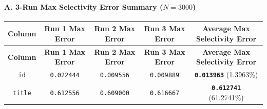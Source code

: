\documentclass[11pt,a4paper]{article}
\begin{document}
\paragraph{A. 3-Run Max Selectivity Error Summary ($N=3000$)}
{\begingroup
\small
\setlength{\tabcolsep}{4pt}
\begin{xltabular}{\textwidth}{C | C | C | C | C}
\toprule
\textbf{Column} & \textbf{Run 1 Max Error} & \textbf{Run 2 Max Error} & \textbf{Run 3 Max Error} & \textbf{\textbf{Average Max Selectivity Error}} \\
\midrule
\endfirsthead
\toprule
\textbf{Column} & \textbf{Run 1 Max Error} & \textbf{Run 2 Max Error} & \textbf{Run 3 Max Error} & \textbf{\textbf{Average Max Selectivity Error}} \\
\midrule
\endfirsthead
\endhead
\bottomrule
\endfoot
\bottomrule
\endlastfoot
\texttt{id} & \texttt{0.022444} & \texttt{0.009556} & \texttt{0.009889} & \textbf{\texttt{0.013963}} (1.3963\%) \\
\texttt{title} & \texttt{0.612556} & \texttt{0.609000} & \texttt{0.616667} & \textbf{\texttt{0.612741}} (61.2741\%) \\
\end{xltabular}
\endgroup}
\end{document}
